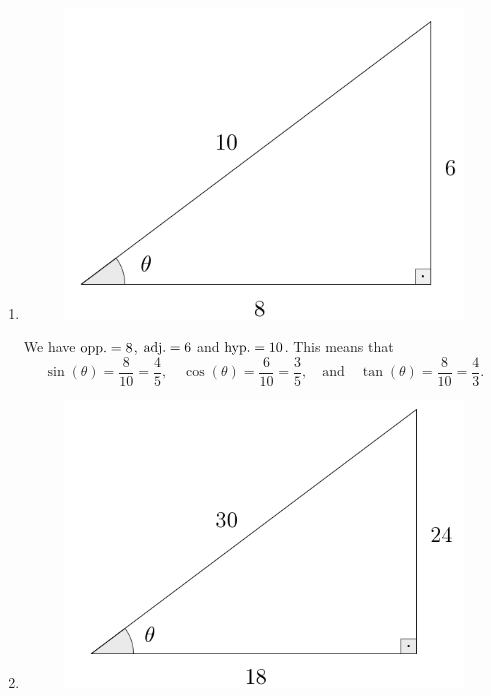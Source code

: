 \documentclass{ximera}
\begin{document}
\begin{example}
\begin{enumerate}[label=\alph*.]
  \item \begin{figure}[h]
  \centering
  \includegraphics[scale=.3]{./figures/9-1-1-triangle-6-8-10.png}
\end{figure}

    \begin{explanation}
      We have ${\rm opp.} = 8$, ${\rm adj.} = 6$ and ${\rm hyp.} = 10$. This means that $$\sin(\theta) = \frac{8}{10}=\frac{4}{5}, \quad \cos(\theta) = \frac{6}{10}=\frac{3}{5},\quad \mbox{and}\quad \tan(\theta) = \frac{8}{10}=\frac{4}{3}.$$
    \end{explanation}
    
  \item \begin{figure}[h]
  \centering
  \includegraphics[scale=.3]{./figures/9-1-1-triangle-18-24-30.png}
\end{figure}



\end{enumerate}
\end{example}
\end{document}
